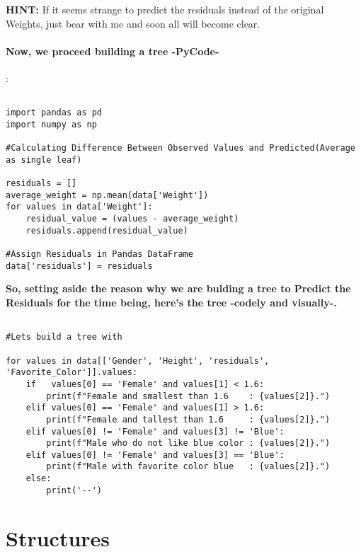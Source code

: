 \documentclass[12pt, a4paper]{article} %
\begin{document}
\textbf{HINT:} If it seems strange to predict the residuals instead of the original Weights, just bear with me and soon all will become clear.

\paragraph{Now, we proceed building a tree -PyCode-}:



\begin{lstlisting}

import pandas as pd
import numpy as np

#Calculating Difference Between Observed Values and Predicted(Average as single leaf)

residuals = []
average_weight = np.mean(data['Weight'])
for values in data['Weight']:
    residual_value = (values - average_weight)
    residuals.append(residual_value)
    
#Assign Residuals in Pandas DataFrame
data['residuals'] = residuals
\end{lstlisting}


\textbf{So, setting aside the reason why we are bulding a tree to Predict the Residuals for the time being, here's the tree -codely and visually-.}


\begin{lstlisting}

#Lets build a tree with

for values in data[['Gender', 'Height', 'residuals', 'Favorite_Color']].values:
    if   values[0] == 'Female' and values[1] < 1.6:
        print(f"Female and smallest than 1.6    : {values[2]}.")
    elif values[0] == 'Female' and values[1] > 1.6:
        print(f"Female and tallest than 1.6     : {values[2]}.")
    elif values[0] != 'Female' and values[3] != 'Blue':
        print(f"Male who do not like blue color : {values[2]}.")
    elif values[0] != 'Female' and values[3] == 'Blue':
        print(f"Male with favorite color blue   : {values[2]}.")
    else:
        print('--')

\end{lstlisting}


\section{Structures}
\end{document}
